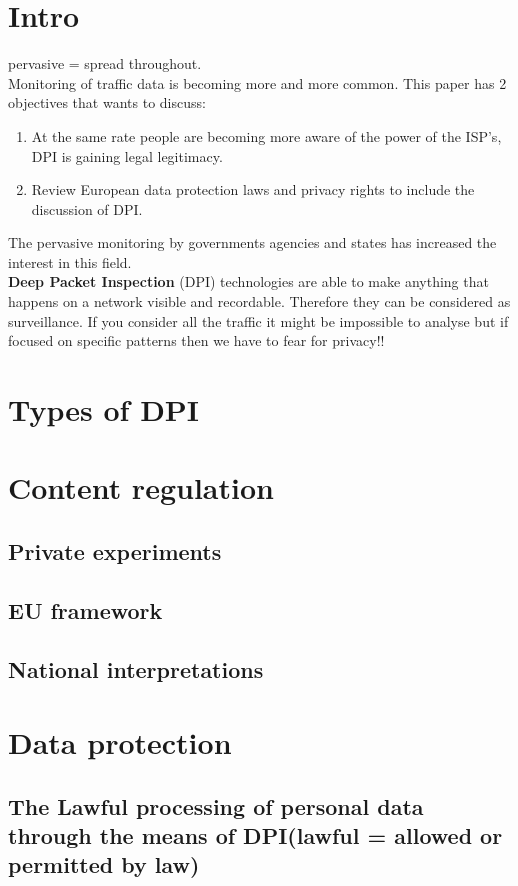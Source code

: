 \documentclass[10pt,a4paper]{report}
\begin{document}
\section{Intro}
pervasive = spread throughout.\\
Monitoring of traffic data is becoming more and more common. This paper has 2 objectives that wants to discuss:\\
\begin{enumerate}
\item At the same rate people are becoming more aware of the power of the ISP's, DPI is gaining legal legitimacy.
\item Review European data protection laws and privacy rights to include the discussion of DPI.
\end{enumerate}
The pervasive monitoring by governments agencies and states has increased the interest in this field.\\
\textbf{Deep  Packet  Inspection} (DPI)  technologies  are  able  to  make  anything  that  happens  on  a  
network  visible  and  recordable. Therefore they can be considered as surveillance. If you consider all the traffic it might be impossible to analyse but if focused on specific patterns then we have to fear for privacy!!
\section{Types of DPI}

\section{Content regulation}
\subsection{Private experiments}
\subsection{EU framework}
\subsection{National interpretations}
\section{Data protection}
\subsection{The Lawful processing of personal data through the means of DPI(lawful = allowed or permitted by law)}
\end{document}
